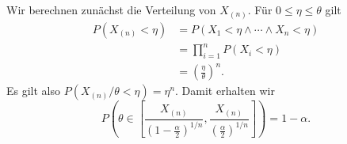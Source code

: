 \solution Wir berechnen zunächst die Verteilung von $X_{(n)}$. Für $0 \leq \eta \leq \theta$
gilt
\begin{align*}
    P\left( X_{(n)} < \eta \right) &= P \left( X_1 < \eta \wedge \cdots \wedge X_n < \eta \right) \\
    &= \prod_{i=1}^{n} P \left( X_i < \eta \right) \\
    &= \left( \frac{\eta}{\theta} \right)^n.
\end{align*}
Es gilt also $P \left( X_{(n)}/\theta < \eta \right) = \eta^{n}$. Damit erhalten wir 
\begin{equation*}
    P \left( \theta \in 
        \left[ \frac{X_{\left( n \right)}}{ \left( 1- \frac{\alpha}{2} \right)^{1/n}},
            \frac{X_{\left( n \right)}}{ \left( \frac{\alpha}{2} \right)^{1/n}}
        \right]
    \right) = 1 - \alpha.
\end{equation*}







